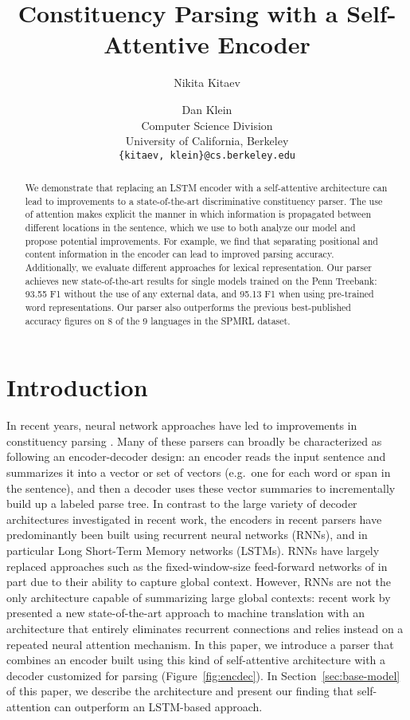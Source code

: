 \documentclass[11pt,a4paper]{article}
\title{Constituency Parsing with a Self-Attentive Encoder}
\author{Nikita Kitaev \and Dan Klein \\
  Computer Science Division \\
  University of California, Berkeley \\
  {\tt \{kitaev, klein\}@cs.berkeley.edu}}
\date{}
\begin{document}
\maketitle
\begin{abstract}
We demonstrate that replacing an LSTM encoder with a self-attentive architecture can lead to improvements to a state-of-the-art discriminative constituency parser. The use of attention makes explicit the manner in which information is propagated between different locations in the sentence, which we use to both analyze our model and propose potential improvements.  For example, we find that separating positional and content information in the encoder can lead to improved parsing accuracy. Additionally, we evaluate different approaches for lexical representation. Our parser achieves new state-of-the-art results for single models trained on the Penn Treebank: 93.55 F1 without the use of any external data, and 95.13 F1 when using pre-trained word representations. Our parser also outperforms the previous best-published accuracy figures on 8 of the 9 languages in the SPMRL dataset.
\end{abstract}

\section{Introduction}
\label{sec:intro}

In recent years, neural network approaches have led to improvements in constituency parsing \citep{dyer_recurrent_2016,cross_span-based_2016,choe_parsing_2016,stern_minimal_2017,fried_improving_2017}. Many of these parsers can broadly be characterized as following an encoder-decoder design: an encoder reads the input sentence and summarizes it into a vector or set of vectors (e.g.\ one for each word or span in the sentence), and then a decoder uses these vector summaries to incrementally build up a labeled parse tree. In contrast to the large variety of decoder architectures investigated in recent work, the encoders in recent parsers have predominantly been built using recurrent neural networks (RNNs), and in particular Long Short-Term Memory networks (LSTMs). RNNs have largely replaced approaches such as the fixed-window-size feed-forward networks of \citet{durrett_neural_2015} in part due to their ability to capture global context. However, RNNs are not the only architecture capable of summarizing large global contexts: recent work by \citet{vaswani_attention_2017} presented a new state-of-the-art approach to machine translation with an architecture that entirely eliminates recurrent connections and relies instead on a repeated neural attention mechanism. In this paper, we introduce a parser that combines an encoder built using this kind of self-attentive architecture with a decoder customized for parsing (Figure~\ref{fig:encdec}). In Section~\ref{sec:base-model} of this paper, we describe the architecture and present our finding that self-attention can outperform an LSTM-based approach.
\end{document}
